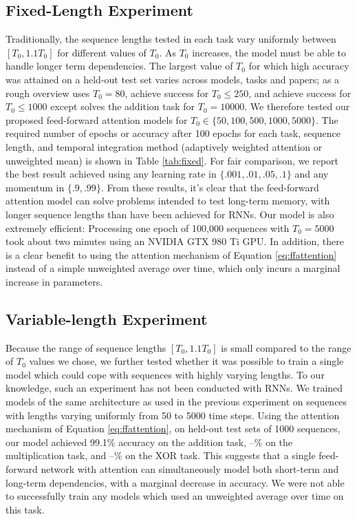 \documentclass{article} %
\begin{document}
\subsection{Fixed-Length Experiment}
\label{sec:fixed}

Traditionally, the sequence lengths tested in each task vary uniformly between $[T_0, 1.1T_0]$ for different values of $T_0$.
As $T_0$ increases, the model must be able to handle longer term dependencies.
The largest value of $T_0$ for which high accuracy was attained on a held-out test set varies across models, tasks and papers; as a rough overview \cite{sutskever2013importance} uses $T_0 = 80$, \cite{le2015simple,martens2011learning} achieve success for $T_0 \le 250$, and \cite{jaegar2012long,hochreiter1997long} achieve success for $T_0 \le 1000$ except \cite{jaegar2012long} solves the addition task for $T_0 = 10000$.
We therefore tested our proposed feed-forward attention models for $T_0 \in \{50, 100, 500, 1000, 5000\}$.
The required number of epochs or accuracy after 100 epochs for each task, sequence length, and temporal integration method (adaptively weighted attention or unweighted mean) is shown in Table \ref{tab:fixed}.
For fair comparison, we report the best result achieved using any learning rate in $\{.001, .01, .05, .1\}$ and any momentum in $\{.9, .99\}$.
From these results, it's clear that the feed-forward attention model can solve problems intended to test long-term memory, with longer sequence lengths than have been achieved for RNNs.
Our model is also extremely efficient: Processing one epoch of 100,000 sequences with $T_0 = 5000$ took about two minutes using an NVIDIA GTX 980 Ti GPU.
In addition, there is a clear benefit to using the attention mechanism of Equation \ref{eq:ffattention} instead of a simple unweighted average over time, which only incurs a marginal increase in parameters.

\subsection{Variable-length Experiment}

Because the range of sequence lengths $[T_0, 1.1T_0]$ is small compared to the range of $T_0$ values we chose, we further tested whether it was possible to train a single model which could cope with sequences with highly varying lengths.
To our knowledge, such an experiment has not been conducted with RNNs.
We trained models of the same architecture as used in the previous experiment on sequences with lengths varying uniformly from 50 to 5000 time steps.
Using the attention mechanism of Equation \ref{eq:ffattention}, on held-out test sets of 1000 sequences, our model achieved 99.1\% accuracy on the addition task, --\% on the multiplication task, and --\% on the XOR task.
This suggests that a single feed-forward network with attention can simultaneously model both short-term and long-term dependencies, with a marginal decrease in accuracy.
We were not able to successfully train any models which used an unweighted average over time on this task. 
\end{document}
